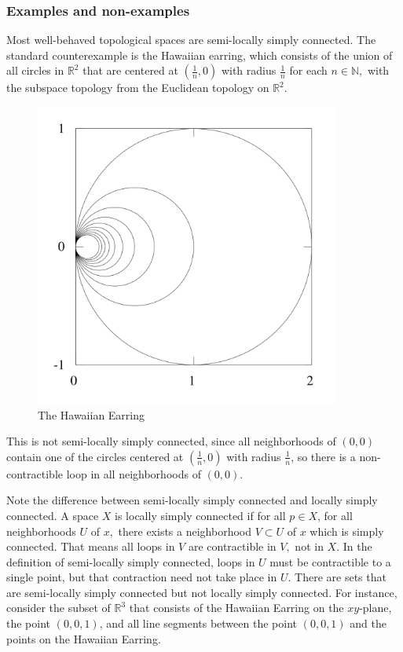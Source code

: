 \documentclass{article}
\theoremstyle{definition}
\begin{document}
\subsubsection{Examples and non-examples}
Most well-behaved topological spaces are semi-locally simply connected. The standard counterexample is the Hawaiian earring, which consists of the union of all circles in $\mathbb{R}^2$ that are centered at $(\frac{1}{n}, 0)$ with radius $\frac{1}{n}$ for each $n\in\mathbb{N},$ with the subspace topology from the Euclidean topology on $\mathbb{R}^2.$
\begin{figure}[H]
\centering
\includegraphics[width=10cm]{images/m4_earring.png}
\caption{\small{The Hawaiian Earring}}
\label{img:m4_hawaiianearring}
\end{figure}
This is not semi-locally simply connected, since all neighborhoods of $(0, 0)$ contain one of the circles centered at $(\frac{1}{n}, 0)$ with radius $\frac{1}{n}$, so there is a non-contractible loop in all neighborhoods of $(0, 0).$

Note the difference between semi-locally simply connected and locally simply connected. A space $X$ is locally simply connected if for all $p\in X$, for all neighborhoods $U$ of $x,$ there exists a neighborhood $V\subset U$ of $x$ which is simply connected. That means all loops in $V$ are contractible in $V,$ not in $X$. In the definition of semi-locally simply connected, loops in $U$ must be contractible to a single point, but that contraction need not take place in $U.$ There are sets that are semi-locally simply connected but not locally simply connected. For instance, consider the subset of $\mathbb{R}^3$ that consists of the Hawaiian Earring on the $xy$-plane, the point $(0, 0, 1)$, and all line segments between the point $(0, 0, 1)$ and the points on the Hawaiian Earring. 
\end{document}
